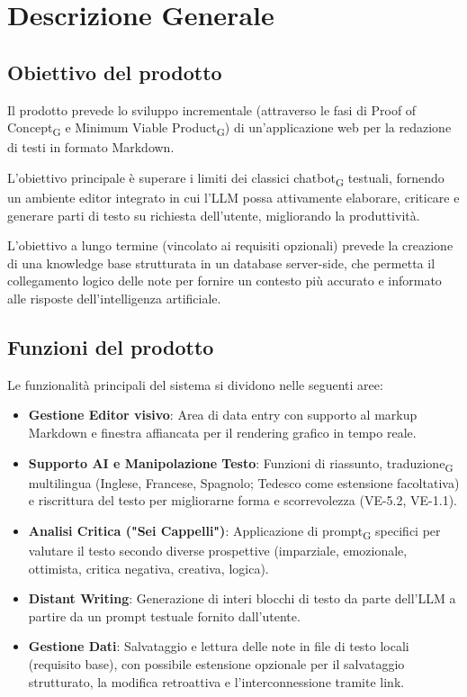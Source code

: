 \section{Descrizione Generale}

\subsection{Obiettivo del prodotto}
Il prodotto prevede lo sviluppo incrementale (attraverso le fasi di Proof of Concept\textsubscript{G} e Minimum Viable Product\textsubscript{G}) di un'applicazione web per la redazione di testi in formato Markdown. 

L'obiettivo principale è superare i limiti dei classici chatbot\textsubscript{G} testuali, fornendo un ambiente editor integrato in cui l'LLM possa attivamente elaborare, criticare e generare parti di testo su richiesta dell'utente, migliorando la produttività. 

L'obiettivo a lungo termine (vincolato ai requisiti opzionali) prevede la creazione di una knowledge base strutturata in un database server-side, che permetta il collegamento logico delle note per fornire un contesto più accurato e informato alle risposte dell'intelligenza artificiale.

\subsection{Funzioni del prodotto}
Le funzionalità principali del sistema si dividono nelle seguenti aree:
\begin{itemize}
    \item \textbf{Gestione Editor visivo}: Area di data entry con supporto al markup Markdown e finestra affiancata per il rendering grafico in tempo reale.
    \item \textbf{Supporto AI e Manipolazione Testo}: Funzioni di riassunto, traduzione\textsubscript{G} multilingua (Inglese, Francese, Spagnolo; Tedesco come estensione facoltativa) e riscrittura del testo per migliorarne forma e scorrevolezza (VE-5.2, VE-1.1).
    \item \textbf{Analisi Critica ("Sei Cappelli")}: Applicazione di prompt\textsubscript{G} specifici per valutare il testo secondo diverse prospettive (imparziale, emozionale, ottimista, critica negativa, creativa, logica).
    \item \textbf{Distant Writing}: Generazione di interi blocchi di testo da parte dell'LLM a partire da un prompt testuale fornito dall'utente.
    \item \textbf{Gestione Dati}: Salvataggio e lettura delle note in file di testo locali (requisito base), con possibile estensione opzionale per il salvataggio strutturato, la modifica retroattiva e l'interconnessione tramite link.
\end{itemize}

